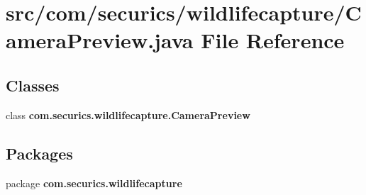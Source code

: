 \section{src/com/securics/wildlifecapture/\+Camera\+Preview.java File Reference}
\label{_camera_preview_8java}
\subsection*{Classes}
\begin{DoxyCompactItemize}
\item 
class {\bf com.\+securics.\+wildlifecapture.\+Camera\+Preview}
\end{DoxyCompactItemize}
\subsection*{Packages}
\begin{DoxyCompactItemize}
\item 
package {\bf com.\+securics.\+wildlifecapture}
\end{DoxyCompactItemize}
